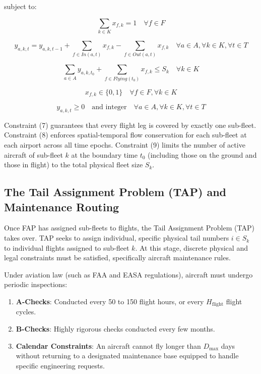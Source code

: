 \documentclass[11pt,a4paper]{book}
\begin{document}
subject to:

\begin{equation}
\sum_{k \in K} x_{f,k} = 1 \quad \forall f \in F
\end{equation}

\begin{equation}
y_{a,k,t} = y_{a,k,t-1} + \sum_{f \in In(a, t)} x_{f,k} - \sum_{f \in Out(a, t)} x_{f,k} \quad \forall a \in A, \forall k \in K, \forall t \in T
\end{equation}

\begin{equation}
\sum_{a \in A} y_{a,k,t_0} + \sum_{f \in Flying(t_0)} x_{f,k} \leq S_k \quad \forall k \in K
\end{equation}

\begin{equation}
x_{f,k} \in \{0,1\} \quad \forall f \in F, \forall k \in K
\end{equation}

\begin{equation}
y_{a,k,t} \geq 0 \quad \text{and integer} \quad \forall a \in A, \forall k \in K, \forall t \in T
\end{equation}

Constraint (7) guarantees that every flight leg is covered by exactly one sub-fleet. Constraint (8) enforces spatial-temporal flow conservation for each sub-fleet at each airport across all time epochs. Constraint (9) limits the number of active aircraft of sub-fleet $k$ at the boundary time $t_0$ (including those on the ground and those in flight) to the total physical fleet size $S_k$.

\subsection{The Tail Assignment Problem (TAP) and Maintenance Routing}

Once FAP has assigned sub-fleets to flights, the Tail Assignment Problem (TAP) takes over. TAP seeks to assign individual, specific physical tail numbers $i \in S_k$ to individual flights assigned to sub-fleet $k$. At this stage, discrete physical and legal constraints must be satisfied, specifically aircraft maintenance rules.

Under aviation law (such as FAA and EASA regulations), aircraft must undergo periodic inspections:
\begin{enumerate}
    \item \textbf{A-Checks}: Conducted every 50 to 150 flight hours, or every $H_{\text{flight}}$ flight cycles.
    \item \textbf{B-Checks}: Highly rigorous checks conducted every few months.
    \item \textbf{Calendar Constraints}: An aircraft cannot fly longer than $D_{\text{max}}$ days without returning to a designated maintenance base equipped to handle specific engineering requests.
\end{enumerate}
\end{document}
